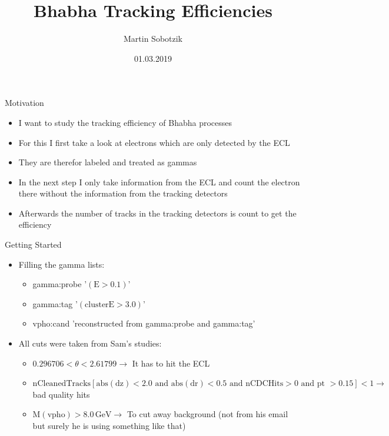 \documentclass[10pt]{beamer}
\title{Bhabha Tracking Efficiencies}
\date{01.03.2019}
\author{Martin Sobotzik}
\institute{Johannes Gutenberg Universit\"at Mainz}
\begin{document}
\maketitle
{%



\begin{frame}{Motivation}

\begin{itemize}	
	\item I want to study the tracking efficiency of Bhabha processes
	\item For this I first take a look at electrons which are only detected by the ECL
	\item They are therefor labeled and treated as gammas
	\item In the next step I only take information from the ECL and count the electron there without the information from the tracking detectors
	\item Afterwards the number of tracks in the tracking detectors is count to get the efficiency
	

\end{itemize}
\end{frame}
	
\begin{frame}{Getting Started}
	
\begin{itemize} 
	\item Filling the gamma lists:
	
	\begin{itemize}
		\item gamma:probe '$(\textrm{E} > 0.1 )$'
		\item gamma:tag '$(\textrm{clusterE} > 3.0)$'
		\item vpho:cand 'reconstructed from gamma:probe and gamma:tag'
	\end{itemize}

	\item All cuts were taken from Sam's studies:
		\begin{itemize}
			\item $0.296706 < \theta < 2.61799 \rightarrow$ It has to hit the ECL
			\item $\textrm{nCleanedTracks}[ \textrm{abs}(\textrm{dz}) < 2.0 \textrm{ and } \textrm{abs}(\textrm{dr}) < 0.5 \textrm{ and nCDCHits} > 0 \textrm{ and pt } > 0.15] < 1 \rightarrow $ bad quality hits 
			\item $\textrm{M}(\textrm{vpho}) > 8.0\,\textrm{GeV} \rightarrow $ To cut away background (not from his email but surely he is using something like that)					
		\end{itemize}
	

\end{itemize}
\end{frame}}
\end{document}

